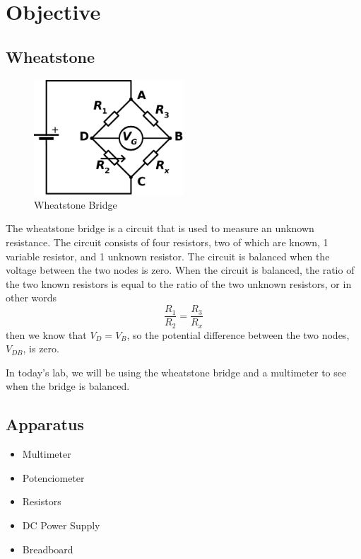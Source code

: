 \documentclass[a4paper, 10pt]{article}
\begin{document}
	\tableofcontents
	\pagebreak
	
	\listoffigures
	\pagebreak

	\listoftables	
	\pagebreak 
	
	\section{Objective}
		\subsection{Wheatstone}
			\begin{figure}[h!]
				\centering
				\includegraphics[width=0.5\textwidth]{./images/WheatstoneBridge.png}
				\caption{Wheatstone Bridge}
				\label{fig:wheatstone}
			\end{figure}

			The wheatstone bridge is a circuit that is used to measure an unknown resistance. 
			The circuit consists of four resistors, two of which are known, 1 variable resistor, and 1 unknown resistor.
			The circuit is balanced when the voltage between the two nodes is zero. 
			When the circuit is balanced, the ratio of the two known resistors is
			equal to the ratio of the two unknown resistors, or in other words 
			\begin{equation}
				\frac{R_1}{R_2} = \frac{R_3}{R_x}
			\end{equation}
			then we know that $V_D = V_B$, so the potential difference between the two nodes, $V_{DB}$, is zero.

			In today's lab, we will be using the wheatstone bridge and a multimeter to see when the bridge
			is balanced.

		\subsection{Apparatus}
			\begin{itemize}
				\item Multimeter
				\item Potenciometer
				\item Resistors
				\item DC Power Supply
				\item Breadboard
			\end{itemize}
\end{document}
